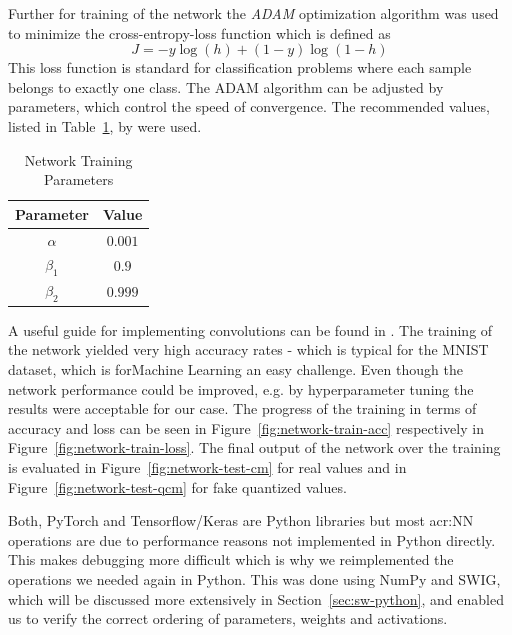 Further for training of the network the \emph{ADAM} optimization algorithm \cite{Kingma:2014aa} was used to minimize the cross-entropy-loss function which is defined as
\begin{equation}
    J = - y  \log(h) + (1-y)  \log(1-h)
\end{equation}
This loss function is standard for classification problems where each sample belongs to exactly one class. 
The ADAM algorithm can be adjusted by parameters, which control the speed of convergence. The recommended values, listed in Table~\ref{tab:train-params}, by \cite{Kingma:2014aa} were used.
\begin{table}[ht]
	\centering
    \begin{tabular}{cc}
        \toprule
            Parameter & Value \\
        \midrule
            $\alpha$   & $0.001$ \\
            $\beta_1$  & $0.9$   \\
            $\beta_2$  & $0.999$  \\          
        \bottomrule
    \end{tabular}
    \caption{Network Training Parameters}
    \label{tab:train-params}
\end{table}


A useful guide for implementing convolutions can be found in \cite{dumoulin2016guide}. The training of the network yielded very high accuracy rates - which is typical for the MNIST dataset, which is forMachine Learning an easy challenge. Even though the network performance could be improved, e.g. by hyperparameter tuning the results were acceptable for our case. The progress of the training in terms of accuracy and loss can be seen in Figure~\ref{fig:network-train-acc} respectively in Figure~\ref{fig:network-train-loss}. The final output of the network over the training is evaluated in Figure~\ref{fig:network-test-cm} for real values and in Figure~\ref{fig:network-test-qcm} for fake quantized values.

Both, PyTorch and Tensorflow/Keras are Python libraries but most \gls{acr:NN} operations are due to performance reasons not implemented in Python directly. This makes debugging more difficult which is why we reimplemented the operations we needed again in Python. This was done using NumPy and SWIG, which will be discussed more extensively in Section~\ref{sec:sw-python}, and enabled us to verify the correct ordering of parameters, weights and activations.

